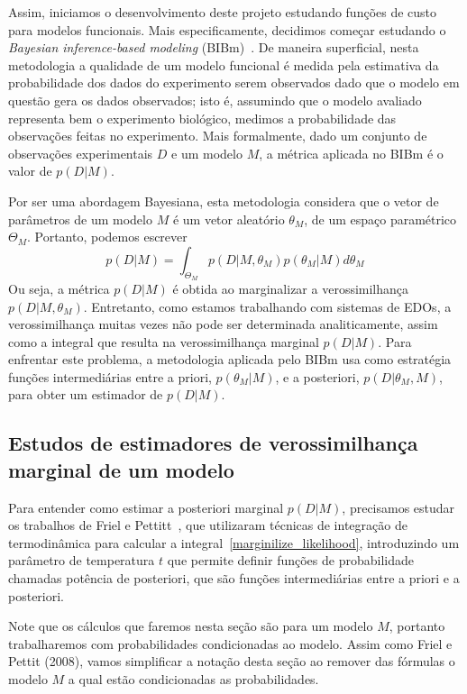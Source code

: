 \documentclass[12pt]{article}
\begin{document}
Assim, iniciamos o desenvolvimento deste projeto estudando funções de
custo para modelos funcionais. Mais especificamente, decidimos começar
estudando o {\em Bayesian inference-based modeling} (BIBm)~\cite{Xu2010}.
De maneira superficial, nesta metodologia a qualidade de um modelo 
funcional é medida pela estimativa da probabilidade dos dados do 
experimento serem observados dado que o modelo em questão gera os dados 
observados; isto é, assumindo que o modelo avaliado representa bem o
experimento biológico, medimos a probabilidade das observações feitas
no experimento. Mais formalmente, dado um conjunto de observações
experimentais $D$ e um modelo $M$, a métrica aplicada no BIBm é o valor
de $p (D | M)$.

Por ser uma abordagem Bayesiana, esta metodologia considera que o vetor
de parâmetros de um modelo $M$ é um vetor aleatório $\theta_M$, de um
espaço paramétrico $\Theta_M$. Portanto, podemos escrever
\begin{equation}\label{marginilize_likelihood}
    p (D | M) = \int_{\Theta_M} p (D | M, \theta_M) p (\theta_M | M) d\theta_M
\end{equation}
Ou seja, a métrica $p (D|M)$ é obtida ao marginalizar a verossimilhança
$p (D | M, \theta_M)$. Entretanto, como estamos trabalhando com sistemas
de EDOs, a verossimilhança muitas vezes não pode ser determinada 
analiticamente, assim como a integral que resulta na verossimilhança
marginal $p (D | M)$. Para enfrentar este problema, a metodologia 
aplicada pelo BIBm usa como estratégia funções intermediárias entre a 
priori, $p (\theta_M | M)$, e a posteriori, $p (D | \theta_M, M)$, para 
obter um estimador de $p (D|M)$.

\subsection{Estudos de estimadores de verossimilhança marginal de um 
modelo}
Para entender como estimar a posteriori marginal $p (D | M)$, 
precisamos estudar os trabalhos de Friel e Pettitt~\cite{Friel2008}, que
utilizaram técnicas de integração de termodinâmica para calcular a 
integral~\ref{marginilize_likelihood}, introduzindo um parâmetro de 
temperatura $t$ que permite definir funções de probabilidade chamadas 
potência de posteriori, que são funções intermediárias entre a priori
e a posteriori.

Note que os cálculos que faremos nesta seção são para um modelo $M$, 
portanto trabalharemos com probabilidades condicionadas ao modelo. Assim 
como Friel e Pettit (2008), vamos simplificar a notação desta seção ao 
remover das fórmulas o modelo $M$ a qual estão condicionadas as 
probabilidades.
\end{document}
